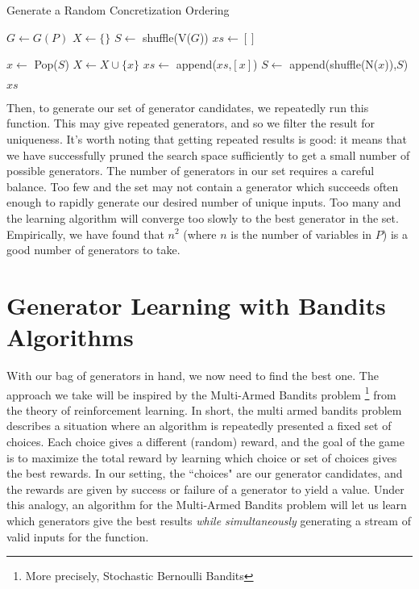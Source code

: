 \documentclass[10pt,a4paper]{article}
\begin{document}
\begin{algorithm}
    \caption{Generate a Random Concretization Ordering}
    \label{alg:generate-ordering}
    \begin{algorithmic}
      \State $G \gets G(P)$ 
      \State $X \gets \{\}$
      \State $S \gets $ shuffle(V($G$))
      \State $xs \gets []$
      
       \State $x \gets $ Pop($S$)
         \State $X \gets X \cup \{x\}$
         \State $xs \gets $ append($xs$,$[x]$)
         \State $S \gets $ append(shuffle(N($x$)),$S$)
       \EndIf

      \EndWhile
      
      \Return $xs$
      
      \EndFunction
    \end{algorithmic}
\end{algorithm}

Then, to generate our set of generator candidates, we repeatedly run this function. This may give repeated generators, and so we filter the result for uniqueness. It's worth noting that getting repeated results is good: it means that we have successfully pruned the search space sufficiently to get a small number of possible generators. The number of generators in our set requires a careful balance. Too few and the set may not contain a generator which succeeds often enough to rapidly generate our desired number of unique inputs. Too many and the learning algorithm will converge too slowly to the best generator in the set. Empirically, we have found that $n^2$ (where $n$ is the number of variables in $P$) is a good number of generators to take.

\section{Generator Learning with Bandits Algorithms}
\label{sec:bandits}
With our bag of generators in hand, we now need to find the best one. The approach we take will be inspired by the Multi-Armed Bandits \cite{gittins1979bandit} problem \footnote{More precisely, Stochastic Bernoulli Bandits} from the theory of reinforcement learning. In short, the multi armed bandits problem describes a situation where an algorithm is repeatedly presented a fixed set of choices. Each choice gives a different (random) reward, and the goal of the game is to maximize the total reward by learning which choice or set of choices gives the best rewards. In our setting, the ``choices" are our generator candidates, and the rewards are given by success or failure of a generator to yield a value. Under this analogy, an algorithm for the Multi-Armed Bandits problem will let us learn which generators give the best results \textit{while simultaneously} generating a stream of valid inputs for the function.
\end{document}
